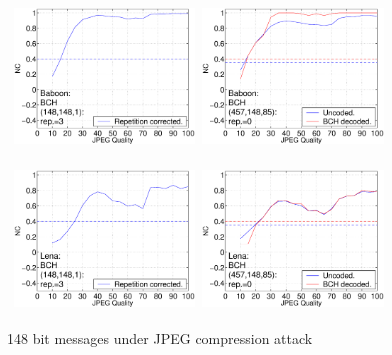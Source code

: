 \documentclass[12pt]{report}
\begin{document}
\begin{figure}[p]
\centerline{ \hbox{
\includegraphics[height=3.81cm,width=4.8cm]{EPS_BK_formattedBetter/ml148bab148.eps}
\includegraphics[height=3.81cm,width=4.8cm]{EPS_BK_formattedBetter/ml148bab457.eps}
}}
 
\centerline{ \hbox{
\includegraphics[height=3.81cm,width=4.8cm]{EPS_BK_formattedBetter/ml148len148.eps}
\includegraphics[height=3.81cm,width=4.8cm]{EPS_BK_formattedBetter/ml148len457.eps}
}}
 
        \caption{148 bit messages under JPEG compression attack}
        \label{fig:148BK32_63_148}
\setlength{\abovecaptionskip}{0cm}
\end{figure}
\end{document}
